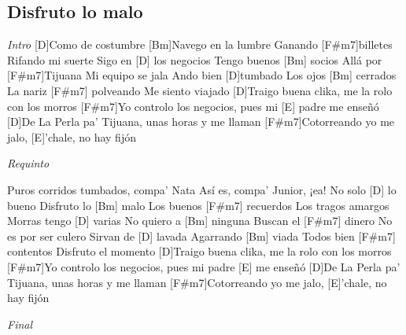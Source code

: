 \subsection{Disfruto lo malo}

\noindent
\vspace{1cm}

\begin{guitar}
	\begin{multicols}{2}

		\textit{Intro}
		[D]Como de costumbre
		[Bm]Navego en la lumbre
		Ganando [F#m7]billetes
		Rifando mi suerte
		Sigo en [D] los negocios
		Tengo buenos [Bm] socios
		Allá por [F#m7]Tijuana
		Mi equipo se jala
		Ando bien [D]tumbado
		Los ojos [Bm] cerrados
		La nariz [F#m7] polveando
		Me siento viajado
		[D]Traigo buena clika, me la rolo con los morros
		[F#m7]Yo controlo los negocios, pues mi [E] padre me enseñó
		[D]De La Perla pa' Tijuana, unas horas y me llaman
		[F#m7]Cotorreando yo me jalo, [E]'chale, no hay fijón

		\textit{Requinto} 
		\par
		Puros corridos tumbados, compa' Nata
		Así es, compa' Junior, ¡ea!
		No solo [D] lo bueno
		Disfruto lo [Bm] malo
		Los buenos [F#m7] recuerdos
		Los tragos amargos
		Morras tengo [D] varias
		No quiero a [Bm] ninguna
		Buscan el [F#m7] dinero
		No es por ser culero
		Sirvan de [D] lavada
		Agarrando [Bm] viada
		Todos bien [F#m7] contentos
		Disfruto el momento
		[D]Traigo buena clika, me la rolo con los morros
		[F#m7]Yo controlo los negocios, pues mi padre [E] me enseñó
		[D]De La Perla pa' Tijuana, unas horas y me llaman
		[F#m7]Cotorreando yo me jalo, [E]'chale, no hay fijón

	\textit{Final}
	\end{multicols}
\end{guitar}
